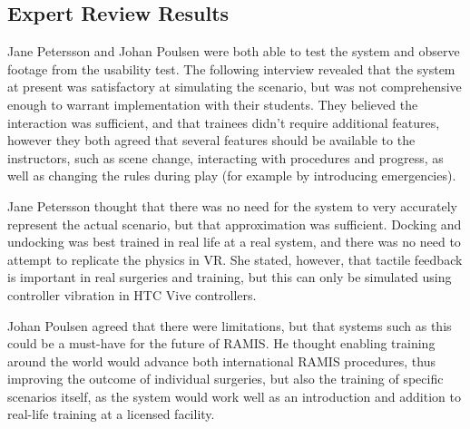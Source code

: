 \subsection{Expert Review Results}

Jane Petersson and Johan Poulsen were both able to test the system and observe footage from the usability test. The following interview revealed that the system at present was satisfactory at simulating the scenario, but was not comprehensive enough to warrant implementation with their students. They believed the interaction was sufficient, and that trainees didn't require additional features, however they both agreed that several features should be available to the instructors, such as scene change, interacting with procedures and progress, as well as changing the rules during play (for example by introducing emergencies). 

Jane Petersson thought that there was no need for the system to very accurately represent the actual scenario, but that approximation was sufficient. Docking and undocking was best trained in real life at a real system, and there was no need to attempt to replicate the physics in VR. She stated, however, that tactile feedback is important in real surgeries and training, but this can only be simulated using controller vibration in HTC Vive controllers.

Johan Poulsen agreed that there were limitations, but that systems such as this could be a must-have for the future of RAMIS. He thought enabling training around the world would advance both international RAMIS procedures, thus improving the outcome of individual surgeries, but also the training of specific scenarios itself, as the system would work well as an introduction and addition to real-life training at a licensed facility.